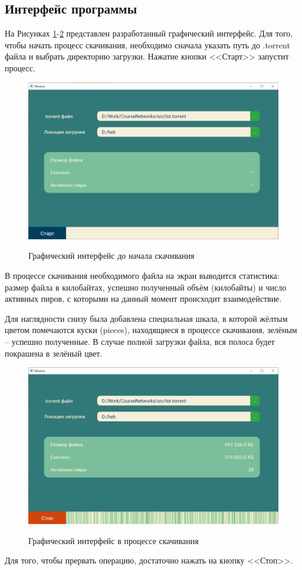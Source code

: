 \subsection{Интерфейс программы}
На Рисунках \ref{fig302:image}-\ref{fig303:image} представлен разработанный графический интерфейс. Для того, чтобы начать процесс скачивания, необходимо сначала указать путь до .torrent файла и выбрать директорию загрузки. Нажатие кнопки <<Старт>> запустит процесс.
\begin{figure}[h]
	\begin{center}
		{\includegraphics[scale = 0.57]{img/interface_before.png}}
		\caption{Графический интерфейс до начала скачивания}
		\label{fig302:image}
	\end{center}
\end{figure}

В процессе скачивания необходимого файла на экран выводится статистика: размер файла в килобайтах, успешно полученный объём (килобайты) и число активных пиров, с которыми на данный момент происходит взаимодействие.

Для наглядности снизу была добавлена специальная шкала, в которой жёлтым цветом помечаются куски (pieces), находящиеся в процессе скачивания, зелёным -- успешно полученные. В случае полной загрузки файла, вся полоса будет покрашена в зелёный цвет. \\

\begin{figure}[h]
	\begin{center}
		{\includegraphics[scale = 0.57]{img/interface_ongoing.png}}
		\caption{Графический интерфейс в процессе скачивания}
		\label{fig303:image}
	\end{center}
\end{figure}

Для того, чтобы прервать операцию, достаточно нажать на кнопку <<Стоп>>.